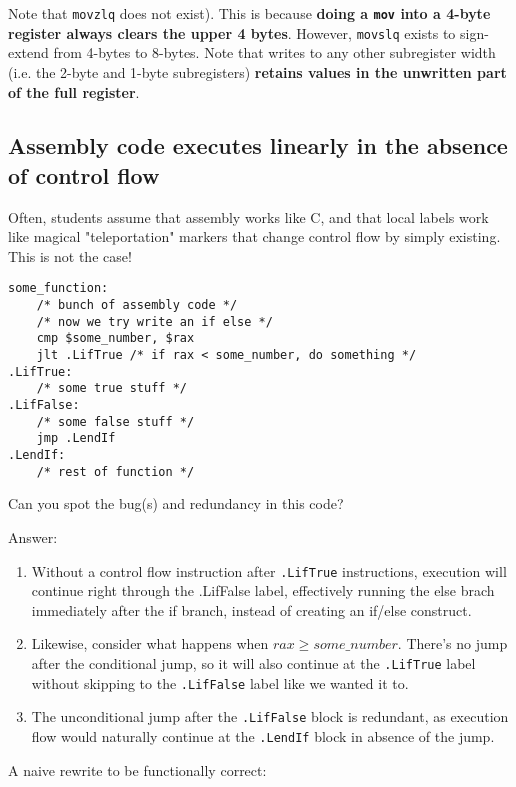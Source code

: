 \documentclass[11pt]{article}
\begin{document}
Note that \texttt{movzlq} does not exist). This is because \textbf{doing a \texttt{mov}
into a 4-byte register always clears the upper 4 bytes}. However, \texttt{movslq} exists
to sign-extend from 4-bytes to 8-bytes. Note that writes to any other subregister width
(i.e. the 2-byte and 1-byte subregisters) \textbf{retains values in the unwritten part of
the full register}.

\subsection{Assembly code executes linearly in the absence of control flow}

Often, students assume that assembly works like C, and that local labels work like magical
"teleportation" markers that change control flow by simply existing. This is not the case!

\begin{lstlisting}[caption={Incorrect assembly control-flow assumptions}, captionpos=b]
some_function:
    /* bunch of assembly code */
    /* now we try write an if else */
    cmp $some_number, $rax
    jlt .LifTrue /* if rax < some_number, do something */
.LifTrue:
    /* some true stuff */
.LifFalse:
    /* some false stuff */
    jmp .LendIf
.LendIf:
    /* rest of function */
\end{lstlisting}

Can you spot the bug(s) and redundancy in this code?

Answer:

\begin{enumerate}
    \item Without a control flow instruction after \texttt{.LifTrue} instructions,
        execution will continue right through the .LifFalse label, effectively running the
        else brach immediately after the if branch, instead of creating an if/else
        construct.
    \item Likewise, consider what happens when $rax \geq some\_number$. There's no jump after
        the conditional jump, so it will also continue at the \texttt{.LifTrue} label without
        skipping to the \texttt{.LifFalse} label like we wanted it to.
    \item The unconditional jump after the \texttt{.LifFalse} block is redundant, as
        execution flow would naturally continue at the \texttt{.LendIf} block in absence
        of the jump.
\end{enumerate}

A naive rewrite to be functionally correct:
\end{document}
